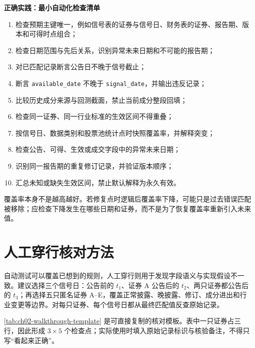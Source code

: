 \begin{practicebox}
\textbf{正确实践：最小自动化检查清单}
\begin{enumerate}
  \item 检查预期主键唯一，例如信号表的证券与信号日、财务表的证券、报告期、版本和可得时点组合；
  \item 检查日期范围与先后关系，识别异常未来日期和不可能的报告期；
  \item 对已匹配记录断言公告日不晚于信号截止；
  \item 断言 \texttt{available\_date} 不晚于 \texttt{signal\_date}，并输出违反记录；
  \item 比较历史成分来源与回测截面，禁止当前成分整段回填；
  \item 检查同一证券、同一行业标准的生效区间不得重叠；
  \item 按信号日、数据类别和股票池统计点时快照覆盖率，并解释突变；
  \item 检查公告、可得、生效或成交字段中的异常未来日期；
  \item 识别同一报告期的重复修订记录，并验证版本顺序；
  \item 汇总未知或缺失生效区间，禁止默认解释为永久有效。
\end{enumerate}
\end{practicebox}

覆盖率本身不是越高越好。若修复点时逻辑后覆盖率下降，可能只是过去错误匹配被移除；应检查下降发生在哪些日期和证券，而不是为了恢复覆盖率重新引入未来值。

\section{人工穿行核对方法}

自动测试可以覆盖已想到的规则，人工穿行则用于发现字段语义与实现假设不一致。建议选择三个信号日：公告前的 $t_1$、证券 A 公告后的 $t_2$、两只证券都公告后的 $t_3$；再选择五只匿名证券 A--E，覆盖正常披露、晚披露、修订、成分进出和行业变更等边界。对每只证券、每个信号日都从最终匹配值反查原始记录。

\cref{tab:ch02-walkthrough-template} 是可直接复制的核对模板。表中一只证券占三行，因此形成 $3\times5$ 个检查点；实际使用时填入原始记录标识与核验备注，不得只写“看起来正确”。

